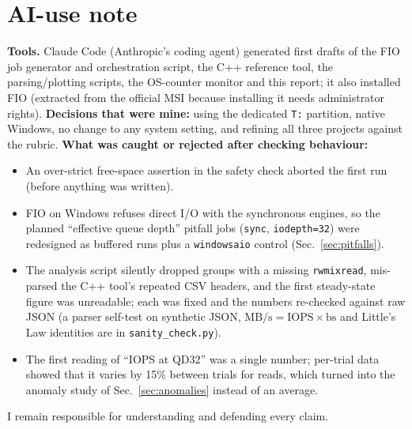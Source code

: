 ﻿\documentclass[10.5pt]{article}
\begin{document}
\section{AI-use note}
\textbf{Tools.} Claude Code (Anthropic's coding agent) generated first drafts of the FIO job generator and orchestration script, the C++ reference tool, the parsing/plotting scripts, the OS-counter monitor and this report; it also installed FIO (extracted from the official MSI because installing it needs administrator rights). \textbf{Decisions that were mine:} using the dedicated \texttt{T:} partition, native Windows, no change to any system setting, and refining all three projects against the rubric. \textbf{What was caught or rejected after checking behaviour:}
\begin{itemize}
  \item An over-strict free-space assertion in the safety check aborted the first run (before anything was written).
  \item FIO on Windows refuses direct I/O with the synchronous engines, so the planned ``effective queue depth'' pitfall jobs (\texttt{sync}, \texttt{iodepth=32}) were redesigned as buffered runs plus a \texttt{windowsaio} control (Sec.~\ref{sec:pitfalls}).
  \item The analysis script silently dropped groups with a missing \texttt{rwmixread}, mis-parsed the C++ tool's repeated CSV headers, and the first steady-state figure was unreadable; each was fixed and the numbers re-checked against raw JSON (a parser self-test on synthetic JSON, $\text{MB/s}=\text{IOPS}\times\text{bs}$ and Little's Law identities are in \texttt{sanity\_check.py}).
  \item The first reading of ``IOPS at QD32'' was a single number; per-trial data showed that it varies by 15\% between trials for reads, which turned into the anomaly study of Sec.~\ref{sec:anomalies} instead of an average.
\end{itemize}
I remain responsible for understanding and defending every claim.
\end{document}
